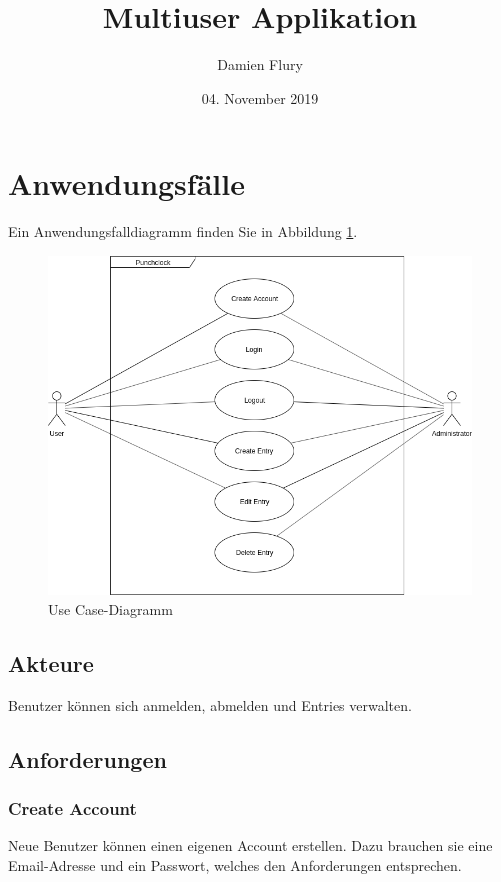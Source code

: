 \documentclass[a4paper, titlepage]{article}
\title{Multiuser Applikation}
\author{Damien Flury}
\date{04. November 2019}
\begin{document}
    \maketitle

    \tableofcontents
    \newpage

    \section{Anwendungsfälle}
    Ein Anwendungsfalldiagramm finden Sie in Abbildung \ref{usecase}.

    \begin{figure}
        \includegraphics[width=\textwidth]{images/UseCaseDiagram.png}
        \caption{Use Case-Diagramm}
        \label{usecase}
    \end{figure}
    \subsection{Akteure}
    Benutzer können sich anmelden, abmelden und Entries verwalten.

    \subsection{Anforderungen}
    \subsubsection{Create Account}
    Neue Benutzer können einen eigenen Account erstellen. Dazu
    brauchen sie eine Email-Adresse und ein Passwort, welches
    den Anforderungen entsprechen.
\end{document}
